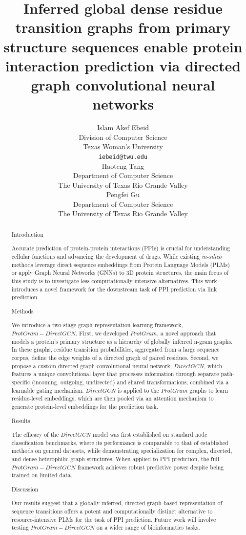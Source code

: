 \documentclass[utf8]{article}
\author{
	Islam Akef Ebeid \\
	Division of Computer Science \\
	Texas Woman's University \\
	\texttt{iebeid@twu.edu} \\
	\And
	Haoteng Tang \\
	Department of Computer Science \\
	The University of Texas Rio Grande Valley \\
	\And
	Pengfei Gu \\
	Department of Computer Science \\
	The University of Texas Rio Grande Valley \\
}
\date{}
\begin{document}
	\title{Inferred global dense residue transition graphs from primary structure sequences enable protein interaction prediction via directed graph convolutional neural networks} 

	\maketitle
	\begin{abstract}
		Introduction
		
		Accurate prediction of protein-protein interactions (PPIs) is crucial for understanding cellular functions and advancing the development of drugs. While existing \textit{in-silico} methods leverage direct sequence embeddings from Protein Language Models (PLMs) or apply Graph Neural Networks (GNNs) to 3D protein structures, the main focus of this study is to investigate less computationally intensive alternatives. This work introduces a novel framework for the downstream task of PPI prediction via link prediction.
		
		Methods
		
		We introduce a two-stage graph representation learning framework, $ProtGram-DirectGCN$. First, we developed $ProtGram$, a novel approach that models a protein's primary structure as a hierarchy of globally inferred n-gram graphs. In these graphs, residue transition probabilities, aggregated from a large sequence corpus, define the edge weights of a directed graph of paired residues. Second, we propose a custom directed graph convolutional neural network, $DirectGCN$, which features a unique convolutional layer that processes information through separate path-specific (incoming, outgoing, undirected) and shared transformations, combined via a learnable gating mechanism. $DirectGCN$ is applied to the $ProtGram$ graphs to learn residue-level embeddings, which are then pooled via an attention mechanism to generate protein-level embeddings for the prediction task.
		
		Results
		
		The efficacy of the $DirectGCN$ model was first established on standard node classification benchmarks, where its performance is comparable to that of established methods on general datasets, while demonstrating specialization for complex, directed, and dense heterophilic graph structures. When applied to PPI prediction, the full $ProtGram-DirectGCN$ framework achieves robust predictive power despite being trained on limited data.
		
		Discussion
		
		Our results suggest that a globally inferred, directed graph-based representation of sequence transitions offers a potent and computationally distinct alternative to resource-intensive PLMs for the task of PPI prediction. Future work will involve testing $ProtGram-DirectGCN$ on a wider range of bioinformatics tasks.
	\end{abstract}
	
\end{document}
